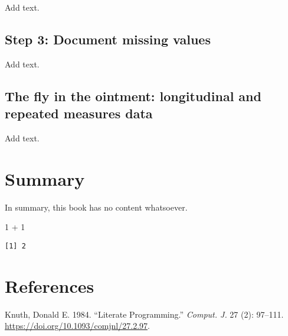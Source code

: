 \documentclass[
  letterpaper,
  DIV=11,
  numbers=noendperiod]{scrreprt}
\newenvironment{Shaded}{\begin{snugshade}}{\end{snugshade}}
\newcommand{\DecValTok}[1]{\textcolor[rgb]{0.68,0.00,0.00}{#1}}
\newcommand{\SpecialCharTok}[1]{\textcolor[rgb]{0.37,0.37,0.37}{#1}}
\newlength{\cslhangindent}
\newlength{\cslentryspacingunit} %
\newenvironment{CSLReferences}[2] %
 {%
  \setlength{\parindent}{0pt}
  \ifodd #1
  \let\oldpar\par
  \def\par{\hangindent=\cslhangindent\oldpar}
  \fi
  \setlength{\parskip}{#2\cslentryspacingunit}
 }%
 {}
\begin{document}
Add text.

\hypertarget{step-3-document-missing-values-1}{%
\section{Step 3: Document missing
values}\label{step-3-document-missing-values-1}}

Add text.

\hypertarget{the-fly-in-the-ointment-longitudinal-and-repeated-measures-data-1}{%
\section{The fly in the ointment: longitudinal and repeated measures
data}\label{the-fly-in-the-ointment-longitudinal-and-repeated-measures-data-1}}

Add text.


\hypertarget{summary}{%
\chapter{Summary}\label{summary}}

In summary, this book has no content whatsoever.

\begin{Shaded}
\begin{Highlighting}[]
\DecValTok{1} \SpecialCharTok{+} \DecValTok{1}
\end{Highlighting}
\end{Shaded}

\begin{verbatim}
[1] 2
\end{verbatim}


\hypertarget{references}{%
\chapter*{References}\label{references}}


\hypertarget{refs}{}
\begin{CSLReferences}{1}{0}
\leavevmode{}%
Knuth, Donald E. 1984. {``Literate Programming.''} \emph{Comput. J.} 27
(2): 97--111. \url{https://doi.org/10.1093/comjnl/27.2.97}.

\end{CSLReferences}
\end{document}
